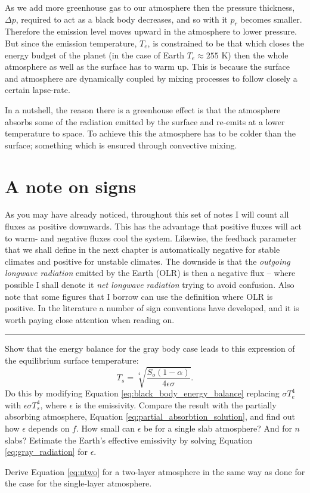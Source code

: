 \documentclass[12pt]{book}
\begin{document}
As we add more greenhouse gas to our atmosphere then the pressure thickness, $\Delta p$, required to act as a black body decreases, and so with it $p_r$ becomes smaller. Therefore the emission level moves upward in the atmosphere to lower pressure. But since the emission temperature, $T_e$, is constrained to be that which closes the energy budget of the planet (in the case of Earth $T_e \approx 255$ K) then the whole atmosphere as well as the surface has to warm up. This is because the surface and atmosphere are dynamically coupled by mixing processes to follow closely a certain lapse-rate.

In a nutshell, the reason there is a greenhouse effect is that the atmosphere absorbs some of the radiation emitted by the surface and re-emits at a lower temperature to space. To achieve this the atmosphere has to be colder than the surface; something which is ensured through convective mixing.


\section{A note on signs}
As you may have already noticed, throughout this set of notes I will count all fluxes as positive downwards. This has the advantage that positive fluxes will act to warm- and negative fluxes cool the system. Likewise, the feedback parameter that we shall define in the next chapter is automatically negative for stable climates and positive for unstable climates. The downside is that the {\em outgoing longwave radiation} emitted by the Earth (OLR) is then a negative flux -- where possible I shall denote it {\em net longwave radiation} trying to avoid confusion. Also note that some figures that I borrow can use the definition where OLR is positive. In the literature a number of sign conventions have developed, and it is worth paying close attention when reading on.

\vspace{1 cm}
{\setlength{\parindent}{0cm}
\hrule
\begin{exercise}
Show that the energy balance for the gray body case leads to this expression of the equilibrium surface temperature:
\begin{equation}
T_s = \sqrt[4]{\frac{S_o(1-\alpha)}{4\epsilon\sigma}}.
\label{eq:gray_radiation}
\end{equation}
Do this by modifying Equation \ref{eq:black_body_energy_balance} replacing $\sigma T_e^4$ with $\epsilon \sigma T_s^4$, where $\epsilon$ is the emissivity. Compare the result with the partially absorbing atmosphere, Equation \ref{eq:partial_absorbtion_solution}, and find out how $\epsilon$ depends on $f$. How small can $\epsilon$ be for a single slab atmosphere? And for $n$ slabs? Estimate the Earth's effective emissivity by solving Equation \ref{eq:gray_radiation} for $\epsilon$.
\end{exercise}

\begin{exercise}
Derive Equation \ref{eq:ntwo} for a two-layer atmosphere in the same way as done for the case for the single-layer atmosphere.
\end{exercise}

}
\end{document}
